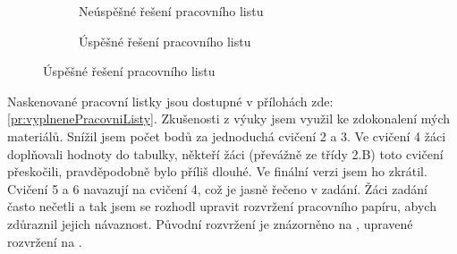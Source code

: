 \begin{figure}[H]
    \begingroup
    \makeatletter
    \renewcommand\thesubfigure{\thefigure~--~\@nameuse{subfiglabel@\alph{subfigure}}}
    \newcommand{\subfiglabel@a}{nahoře}
    \newcommand{\subfiglabel@b}{dole}
    \captionsetup[subfigure]{labelformat=simple, labelsep=colon}
    \renewcommand\p@subfigure{}
    \makeatother
    \begin{subfigure}{\textwidth}
        \centering
        \hspace{1cm}
        \caption{Neúspěšné řešení pracovního listu \jaObr}
        \label{obr:prikladNeuspesny}
    \end{subfigure}\odst
    \begin{subfigure}{\textwidth}
        \centering
        \hspace{1cm}
        \caption{Úspěšné řešení pracovního listu \jaObr}
        \label{obr:prikladUspesny}
    \end{subfigure}
    \endgroup
\end{figure}
{Naskenované pracovní listky jsou dostupné v přílohách zde: \ref{pr:vyplnenePracovniListy}.}
\newpage
{Zkušenosti z výuky jsem využil ke zdokonalení mých materiálů. Snížil jsem počet bodů za jednoduchá cvičení 2 a 3. Ve cvičení 4 žáci doplňovali hodnoty do tabulky, někteří žáci (převážně ze třídy 2.B) toto cvičení přeskočili, pravděpodobně bylo příliš dlouhé. Ve finální verzi jsem ho zkrátil. Cvičení 5 a 6 navazují na cvičení 4, což je jasně řečeno v zadání. Žáci zadání často nečetli a tak jsem se rozhodl upravit rozvržení pracovního papíru, abych zdůraznil jejich návaznost. Původní rozvržení je znázorněno na , upravené rozvržení na .}
